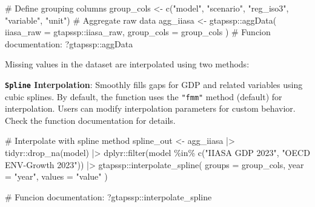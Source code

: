 \documentclass[
  letterpaper,
  DIV=11,
  numbers=noendperiod]{scrartcl}
\newenvironment{Shaded}{}{}
\newcommand{\AttributeTok}[1]{\textcolor[rgb]{0.00,0.34,0.68}{#1}}
\newcommand{\CommentTok}[1]{\textcolor[rgb]{0.54,0.53,0.53}{#1}}
\newcommand{\FunctionTok}[1]{\textcolor[rgb]{0.39,0.29,0.61}{#1}}
\newcommand{\NormalTok}[1]{\textcolor[rgb]{0.12,0.11,0.11}{#1}}
\newcommand{\OtherTok}[1]{\textcolor[rgb]{0.00,0.43,0.16}{#1}}
\newcommand{\SpecialCharTok}[1]{\textcolor[rgb]{0.24,0.68,0.91}{#1}}
\newcommand{\StringTok}[1]{\textcolor[rgb]{0.75,0.01,0.01}{#1}}
\begin{document}
\begin{Shaded}
\begin{Highlighting}[]
\CommentTok{\# Define grouping columns}
\NormalTok{group\_cols }\OtherTok{\textless{}{-}} \FunctionTok{c}\NormalTok{(}\StringTok{"model"}\NormalTok{, }\StringTok{"scenario"}\NormalTok{, }\StringTok{"reg\_iso3"}\NormalTok{, }\StringTok{"variable"}\NormalTok{, }\StringTok{"unit"}\NormalTok{)}
\CommentTok{\# Aggregate raw data}
\NormalTok{agg\_iiasa }\OtherTok{\textless{}{-}}\NormalTok{ gtapssp}\SpecialCharTok{::}\FunctionTok{aggData}\NormalTok{(}
  \AttributeTok{iiasa\_raw =}\NormalTok{ gtapssp}\SpecialCharTok{::}\NormalTok{iiasa\_raw,}
  \AttributeTok{group\_cols =}\NormalTok{ group\_cols}
\NormalTok{)}
\CommentTok{\# Funcion documentation:}
\NormalTok{?gtapssp}\SpecialCharTok{::}\NormalTok{aggData}
\end{Highlighting}
\end{Shaded}

Missing values in the dataset are interpolated using two methods:

\textbf{\texttt{Spline} Interpolation}: Smoothly fills gaps for GDP and
related variables using cubic splines. By default, the function uses the
\texttt{"fmm"} method (default) for interpolation. Users can modify
interpolation parameters for custom behavior. Check the function
documentation for details.

\begin{Shaded}
\begin{Highlighting}[]
\CommentTok{\# Interpolate with spline method}
\NormalTok{spline\_out }\OtherTok{\textless{}{-}}\NormalTok{ agg\_iiasa }\SpecialCharTok{|\textgreater{}}
\NormalTok{  tidyr}\SpecialCharTok{::}\FunctionTok{drop\_na}\NormalTok{(model) }\SpecialCharTok{|\textgreater{}}
\NormalTok{  dplyr}\SpecialCharTok{::}\FunctionTok{filter}\NormalTok{(model }\SpecialCharTok{\%in\%} \FunctionTok{c}\NormalTok{(}\StringTok{"IIASA GDP 2023"}\NormalTok{, }\StringTok{"OECD ENV{-}Growth 2023"}\NormalTok{)) }\SpecialCharTok{|\textgreater{}}
\NormalTok{  gtapssp}\SpecialCharTok{::}\FunctionTok{interpolate\_spline}\NormalTok{(}
    \AttributeTok{groups =}\NormalTok{ group\_cols,}
    \AttributeTok{year =} \StringTok{"year"}\NormalTok{,}
    \AttributeTok{values =} \StringTok{"value"}
\NormalTok{  )}

\CommentTok{\# Funcion documentation:}
\NormalTok{?gtapssp}\SpecialCharTok{::}\NormalTok{interpolate\_spline}
\end{Highlighting}
\end{Shaded}
\end{document}
